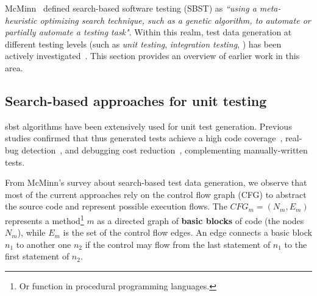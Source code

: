 
McMinn~\cite{McMinn2004} defined search-based software testing (SBST) as \textit{``using a meta-heuristic optimizing search technique, such as a genetic algorithm, to automate or partially automate a testing task"}.
Within this realm, test data generation at different testing levels (such as \textit{unit testing}, \textit{integration testing}, \etc) has been actively investigated~\cite{McMinn2004}. This section 
provides an overview of earlier work in this area.



\subsection{Search-based approaches for unit testing}
\acrshort{sbst} algorithms have been extensively used for unit test generation. Previous studies confirmed that thus generated tests achieve a high code coverage~\cite{Panichella2018a, Campos2018}, real-bug detection~\cite{almasi2017industrial}, and debugging cost reduction~\cite{soltani2017, Panichella2016}, complementing manually-written tests.


From McMinn's \cite{McMinn2004} survey about search-based test data generation, we observe that most of the current approaches rely on the control flow graph (CFG) to 
abstract the source code and represent possible execution flows. The $CFG_m=(N_m,E_m)$ represents a method\footnote{Or function in procedural programming languages.} $m$ as a directed graph of \textbf{basic blocks} of code (the nodes $N_m$), while $E_m$ is the set of the control flow edges. An edge connects a basic block $n_1$ to another one $n_2$ if the control may flow from the last statement of $n_1$ to the first statement of $n_2$.

